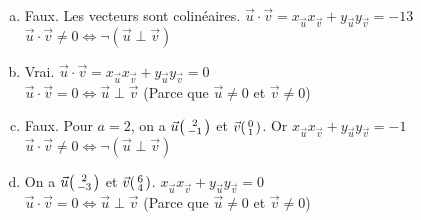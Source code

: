 \documentclass[12pt, a4paper]{article}
\begin{document}
\begin{Exercise}[number={65}]
    \begin{enumerate}[a)]
        \item Faux. Les vecteurs sont colinéaires. $\vec{u}\cdot\vec{v}=x_{\vec{u}} x_{\vec{v}}+y_{\vec{u}} y_{\vec{v}}=-13$ \\ $\vec{u}\cdot\vec{v}\neq0\iff\lnot(\vec{u}\perp \vec{v})$
        \item Vrai. $\vec{u}\cdot\vec{v}=x_{\vec{u}} x_{\vec{v}}+y_{\vec{u}} y_{\vec{v}}=0$ \\ $\vec{u}\cdot\vec{v}=0\iff \vec{u}\perp \vec{v}$ \quad (Parce que $\vec{u}\neq0$ et $\vec{v}\neq0$)
        \item Faux. Pour $a=2$, on a $\vec{u}\begin{psmallmatrix}2\\-1\end{psmallmatrix}$ et $ \vec{v}\begin{psmallmatrix}0\\1\end{psmallmatrix}$. Or $x_{\vec{u}}x_{\vec{v}}+y_{\vec{u}}y_{\vec{v}}=-1$ \\ $\vec{u}\cdot\vec{v}\neq0\iff\lnot(\vec{u}\perp \vec{v})$
        \item On a $\vec{u}\begin{psmallmatrix}2\\-3\end{psmallmatrix}$ et $\vec{v}\begin{psmallmatrix}6\\4\end{psmallmatrix}$. $x_{\vec{u}}x_{\vec{v}}+y_{\vec{u}}y_{\vec{v}}=0$ \\ $\vec{u}\cdot\vec{v}=0\iff \vec{u}\perp \vec{v}$ \quad (Parce que $\vec{u}\neq0$ et $\vec{v}\neq0$)
    \end{enumerate}
\end{Exercise}
\end{document}
